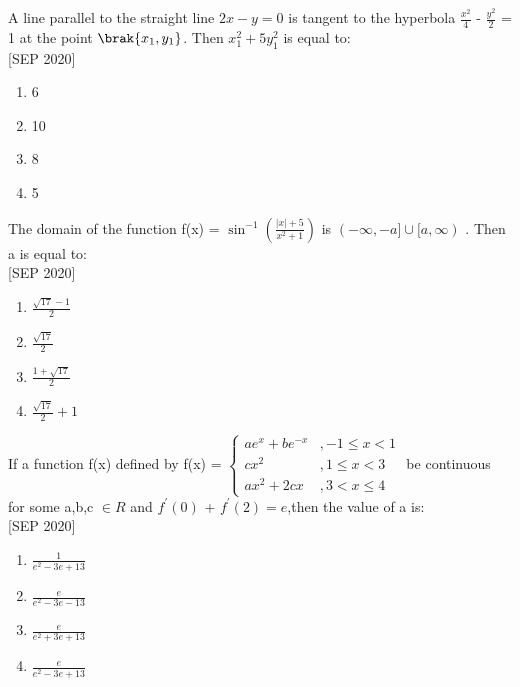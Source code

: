 \iffalse
  \title{Assignment}
  \author{ee24btech11030}
  \section{mcq-single}
\fi


	\item A line parallel to the straight line $2x-y=0$ is tangent to the hyperbola $\frac{x^2}{4}$ - $\frac{y^2}{2}$ = 1 at the point $\brak{x_1,y_1}$. Then $x_1^2 + 5y_1^2$ is equal to: \\ \hfill{[SEP 2020]}
    \begin{multicols}{4}
    \begin{enumerate}
        \item 6
        \item 10
        \item 8
        \item 5
    \end{enumerate}
    \end{multicols}
    \item The domain of the function f(x) = $\sin^{-1}\left(\frac{|x| + 5}{x^2 + 1}\right)$ is $(-\infty,-a]\cup[a,\infty)$ . Then a is equal to: \\\hfill{[SEP 2020]}
    \begin{multicols}{4}
    \begin{enumerate}
        \item $\frac{\sqrt{17}-1}{2}$
        \item $\frac{\sqrt{17}}{2}$
        \item $\frac{1 + \sqrt{17}}{2}$
        \item $\frac{\sqrt{17}}{2} + 1$
    \end{enumerate} 
    \end{multicols}
    \item If a function f(x) defined by f(x) = $\left\{\begin{array}{ll}ae^x + be^{-x}& ,  -1 \leq x < 1 \\cx^2 & ,  1 \leq x < 3 \\ax^2 + 2cx & ,  3 < x \leq 4\end{array}\right.$ be continuous for some a,b,c $\in R$ and $f^{\prime}(0)$ + $f^{\prime}(2) = e$,then the value of a is: \\\hfill{[SEP 2020]}
    \begin{multicols}{4}
    \begin{enumerate}
        \item $\frac{1}{e^2 - 3e + 13}$
        \item $\frac{e}{e^2 - 3e - 13}$
        \item $\frac{e}{e^2 + 3e + 13}$
        \item $\frac{e}{e^2 - 3e + 13}$
    \end{enumerate} 
    \end{multicols}
